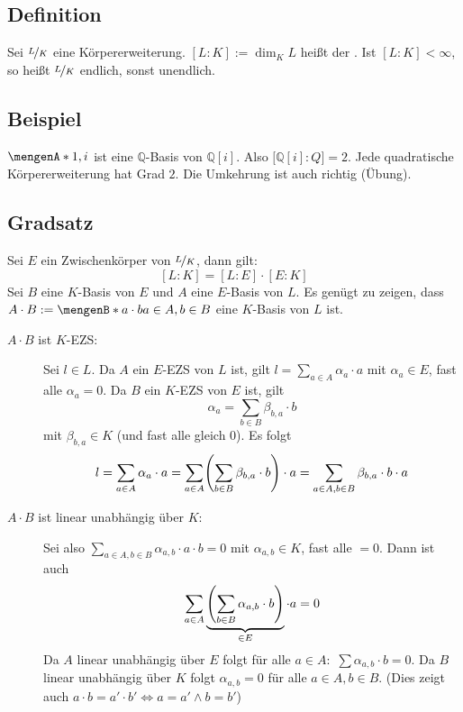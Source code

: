 \subsection[Definition: Grad einer Körpererweiterung]{Definition} %
\label{sub:11.8}
Sei $\nicefrac{L}{K}$ eine Körpererweiterung. $[L:K] := \dim_K L$ heißt der . Ist $[L:K] < \infty$, so heißt
$\nicefrac{L}{K}$ endlich, sonst unendlich.

\subsection[{Beispiel: Grad von $\nicefrac{\mathds{Q}[i]}{\mathds{Q}}$}]{Beispiel} %
\label{sub:11.9}
$\set{1,i}$ ist eine $\mathds{Q}$-Basis von $\mathds{Q}[i]$. Also $\big[\mathds{Q}[i] :Q\big] =2$. Jede quadratische Körpererweiterung hat Grad $2$. Die Umkehrung ist auch 
richtig (Übung).

\subsection{Gradsatz} %
\label{sub:1110}
Sei $E$ ein Zwischenkörper von $\nicefrac{L}{K}$, dann gilt: 
\[
	[L : K] = [L: E] \cdot [E :K]
\]
Sei $B$ eine $K$-Basis von $E$ und $A$ eine $E$-Basis von $L$. Es genügt zu zeigen, dass $A \cdot B := \set[a \cdot b]{a \in A, b \in B} $ eine $K$-Basis von $L$ ist.
\begin{description}
	\item[$A \cdot B$ ist $K$-EZS:] Sei $l \in L$. Da $A$ ein $E$-EZS von $L$ ist, gilt $l = \sum_{a \in A} \alpha_a \cdot a$ mit $\alpha_a \in E$, fast alle $\alpha_a=0$.
	Da $B$ ein $K$-EZS von $E$ ist, gilt
	\[
		\alpha_a = \sum_{b \in B} \beta_{b,a} \cdot b
	\]
	mit $\beta_{b,a} \in K$ (und fast alle gleich 0). Es folgt 
	\[
		l = \sum_{a \in A} \alpha_a \cdot a = \sum_{a \in A} \enbrace*{\sum_{b \in B} \beta_{b,a} \cdot b } \cdot a = \sum_{a \in A, b \in B}\beta_{b,a} \cdot b \cdot a
	\]
	\item[$A \cdot B$ ist linear unabhängig über $K$:] Sei also $\sum_{a \in A, b \in B}\alpha_{a,b} \cdot a \cdot b =0$ mit $\alpha_{a,b} \in K$, fast alle $=0$. Dann ist
	auch 
	\[
		\sum_{a \in A } \underbrace{\enbrace*{ \sum_{b \in B} \alpha_{a,b} \cdot b}}_{\in E} \cdot a = 0 
	\]
	Da $A$ linear unabhängig über $E$ folgt für alle $a \in A:$ $\sum \alpha_{a,b} \cdot b =0$. Da $B$ linear unabhängig über $K$ folgt $\alpha_{a,b}=0$ für alle 
	$a\in A, b \in B$. (Dies zeigt auch $a \cdot  b = a' \cdot b' \iff a=a' \wedge b=b'$) \bewende
\end{description}

